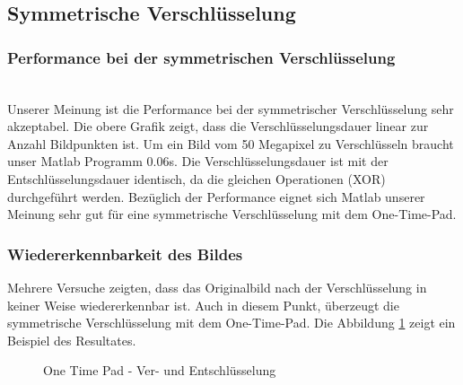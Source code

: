 \documentclass[paper=a4,fontsize=12pt]{scrartcl}
\begin{document}
\subsection{Symmetrische Verschlüsselung}
\subsubsection{Performance bei der symmetrischen Verschlüsselung}
 \\
Unserer Meinung ist die Performance bei der symmetrischer Verschlüsselung sehr akzeptabel.
Die obere Grafik zeigt, dass die Verschlüsselungsdauer linear zur Anzahl Bildpunkten ist.
Um ein Bild vom 50 Megapixel zu Verschlüsseln braucht unser Matlab Programm 0.06s.
Die Verschlüsselungsdauer ist mit der Entschlüsselungsdauer identisch, da die gleichen Operationen (XOR) durchgeführt werden.
Bezüglich der Performance eignet sich Matlab unserer Meinung sehr gut für eine symmetrische Verschlüsselung mit dem One-Time-Pad.

\subsubsection{Wiedererkennbarkeit des Bildes}
Mehrere Versuche zeigten, dass das Originalbild nach der Verschlüsselung in keiner Weise wiedererkennbar ist.
Auch in diesem Punkt, überzeugt die symmetrische Verschlüsselung mit dem One-Time-Pad.
Die Abbildung \ref{sym-enc-result} zeigt ein Beispiel des Resultates.
\begin{figure}[H] 
	\centering
	\caption[One Time Pad - Ver- und Entschlüsselung]{One Time Pad - Ver- und Entschlüsselung}  
	\label{sym-enc-result} 
\end{figure}
\end{document}
